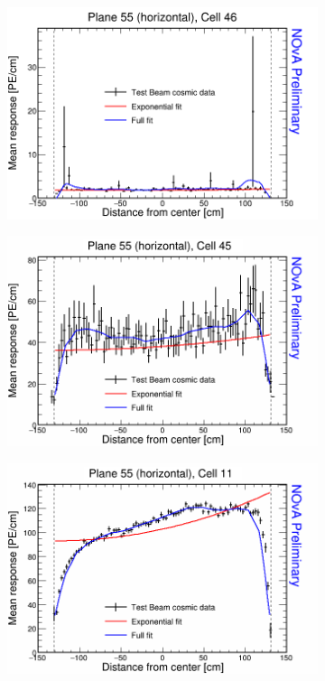 \begin{figure}[!hbtp]
  \begin{subfigure}{0.495\textwidth}
    \includegraphics[width=\linewidth]{Plots/RelativeCalibrationResults/p2_055_046.png}
  \end{subfigure}
  \begin{subfigure}{0.495\textwidth}
    \includegraphics[width=\linewidth]{Plots/RelativeCalibrationResults/p2_055_045.png}
  \end{subfigure}
  \begin{subfigure}{0.495\textwidth}
    \includegraphics[width=\linewidth]{Plots/RelativeCalibrationResults/p2_055_011.png}

\end{subfigure}
\end{figure}
